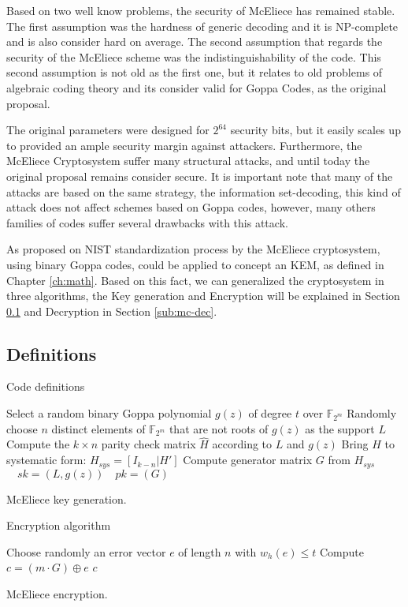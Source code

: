 Based on two well know problems, the security of McEliece has remained stable. The first assumption was the hardness of generic decoding and it is NP-complete and is also consider hard on average. The second assumption that regards the security of the McEliece scheme was the indistinguishability of the code. This second assumption is not old as the first one, but it relates to old problems of algebraic coding theory and its consider valid for Goppa Codes, as the original proposal. 

The original parameters were designed for $2^{64}$ security bits, but it easily scales up to provided an ample security margin against attackers. Furthermore, the McEliece Cryptosystem suffer many structural attacks, and until today the original proposal remains consider secure. It is important note that many of the attacks are based on the same strategy, the information set-decoding, this kind of attack does not affect schemes based on Goppa codes, however, many others families of codes suffer several drawbacks with this attack. 

As proposed on NIST standardization process by \cite{bernstein2017classic, bardet2017big} the McEliece cryptosystem, using binary Goppa codes, could be applied to concept an KEM, as defined in Chapter \ref{ch:math}. Based on this fact, we can generalized the cryptosystem in three algorithms, the Key generation and Encryption will be explained in Section \ref{sub:mc-def} and Decryption in Section \ref{sub:mc-dec}.

\subsection{Definitions}
\label{sub:mc-def}
Code definitions

\begin{algorithm}[!ht]
 Select a random binary Goppa polynomial $g(z)$ of degree $t$ over $\mathbb{F}_{2^{m}}$\;
 Randomly choose $n$ distinct elements of $\mathbb{F}_{2^m}$ that are not roots of $g(z)$ as the support $L$\;
 Compute the $k \times n$ parity check matrix $\hat{H}$ according to $L$ and $g(z)$\;
 Bring $H$ to systematic form: $H_{sys} = [I_{k-n}|H']$\;
 Compute generator matrix $G$ from $H_{sys}$\;
 \Return $\quad sk = (L, g(z)) \quad pk = (G)$\;
 \caption{McEliece key generation.}
 \label{alg:1}
\end{algorithm}

Encryption algorithm
\begin{algorithm}[!ht]
Choose randomly an error vector $e$ of length $n$ with $w_h(e)\leq t$\;
Compute $c = (m\cdot G) \oplus e$\;
\Return $c$\;

 \caption{McEliece encryption.}\label{alg:2}
\end{algorithm}

